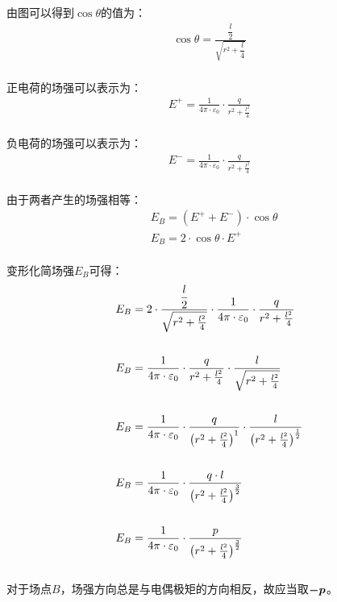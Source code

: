 \documentclass[UTF8]{ctexart}
\newcommand*{\veb}[1]{\vb*{#1}}
\begin{document}
\newpage

    由图可以得到$\cos{\theta}$的值为：
    \begin{align}
        \cos{\theta}=\frac{\dfrac{l}{2}}{\sqrt{r^2+\dfrac{l}{4}}}
    \end{align}\\
    正电荷的场强可以表示为：
    \begin{align}
        E^+=\frac{1}{4\pi\cdot\varepsilon_0}\cdot\frac{q}{r^2+\frac{l^2}{4}}
    \end{align}\\
    负电荷的场强可以表示为：
    \begin{align}
        E^-=\frac{1}{4\pi\cdot\varepsilon_0}\cdot\frac{q}{r^2+\frac{l^2}{4}}
    \end{align}\\
    由于两者产生的场强相等：
    \begin{align}
        &E_B=\left(E^++E^-\right)\cdot\cos{\theta}\\[3mm]
        &E_B=2\cdot\cos{\theta}\cdot E^+
    \end{align}\\
    变形化简场强$E_B$可得：
    \begin{align}
        &E_B=2\cdot\frac{\dfrac{l}{2}}{\sqrt{r^2+\frac{l^2}{4}}}\cdot\frac{1}{4\pi\cdot\varepsilon_0}\cdot\frac{q}{r^2+\frac{l^2}{4}}\\[6mm]
        &E_B=\frac{1}{4\pi\cdot\varepsilon_0}\cdot\frac{q}{r^2+\frac{l^2}{4}}\cdot\frac{l}{\sqrt{r^2+\frac{l^2}{4}}}\\[6mm]
        &E_B=\frac{1}{4\pi\cdot\varepsilon_0}\cdot\frac{q}{\left(r^2+\frac{l^2}{4}\right)^{1\vphantom{\frac{1}{1}}}}\cdot\frac{l}{\left(r^2+\frac{l^2}{4}\right)^{\frac{1}{2}}}\\[6mm]
        &E_B=\frac{1}{4\pi\cdot\varepsilon_0}\cdot\frac{q\cdot l}{\left(r^2+\frac{l^2}{4}\right)^{\frac{3}{2}}}\\[6mm]
        &E_B=\frac{1}{4\pi\cdot\varepsilon_0}\cdot\frac{p}{\left(r^2+\frac{l^2}{4}\right)^{\frac{3}{2}}}
    \end{align}\\[1mm]
    对于场点$B$，场强方向总是与电偶极矩的方向相反，故应当取$\veb{-p}$。

\newpage
\end{document}
